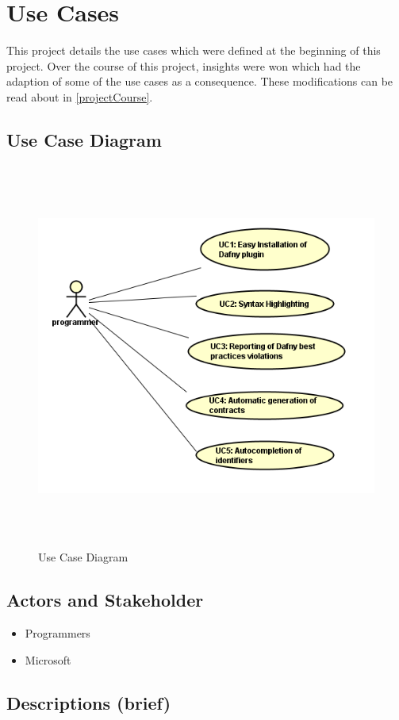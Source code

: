\section{Use Cases}
This project details the use cases which were defined at the beginning of this project. Over the course of this project, insights were won which had the adaption of some of the use cases as a consequence. These modifications can be read about in \ref{projectCourse}.
\subsection{Use Case Diagram}
\begin{figure}[h]
	\centering
	\includegraphics[width=1\linewidth, height=5in]{"./img/UseCase"}
	\caption{Use Case Diagram}
	\label{fig:usecase-diagram}
\end{figure}
\subsection{Actors and Stakeholder}
\begin{itemize}
	\item Programmers
	\item Microsoft
\end{itemize}
\subsection{Descriptions (brief)}
